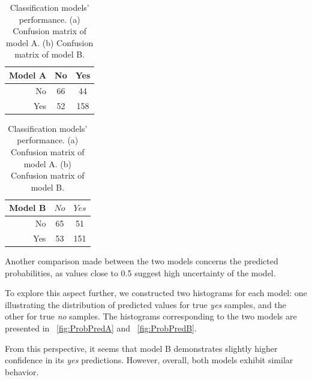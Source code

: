 \begin{table}[H]
	\begin{subtable}[h]{0.4\textwidth}
		\centering
		\begin{tabular}{|| cr | cc ||}    
			\hline
			\multicolumn{2}{|c|}{Model A} 
			& No & Yes \\
			\hline
			& No & 66 & 44 \\
			& Yes & 52 & 158 \\
			\hline
		\end{tabular}
		\caption{}
		\label{table:ConfMatModA}
	\end{subtable}
	\hfill
	\begin{subtable}[h]{0.4\textwidth}
		\centering
		\begin{tabular}{|| cr | cc ||}    
			\hline
			\multicolumn{2}{|c|}{Model B} 
			& $No$ & $Yes$ \\
			\hline
			& No & 65 & 51 \\
			& Yes & 53 & 151 \\
			\hline
		\end{tabular}
		\caption{}
		\label{table:ConfMatModA}
	\end{subtable}
	\caption{Classification models' performance. (a) Confusion matrix of model A. (b) Confusion matrix of model B.}
	\label{table:ConfMat}
\end{table}


Another comparison made between the two models concerns the predicted probabilities, as values close to 0.5 suggest high uncertainty of the model.

To explore this aspect further, we constructed two histograms for each model: one illustrating the distribution of predicted values for true \textit{yes} samples, and the other for true \textit{no} samples. The histograms corresponding to the two models are presented in \Fig~\ref{fig:ProbPredA} and \Fig~\ref{fig:ProbPredB}. 

From this perspective, it seems that model B demonstrates slightly higher confidence in its \textit{yes} predictions. However, overall, both models exhibit similar behavior.


